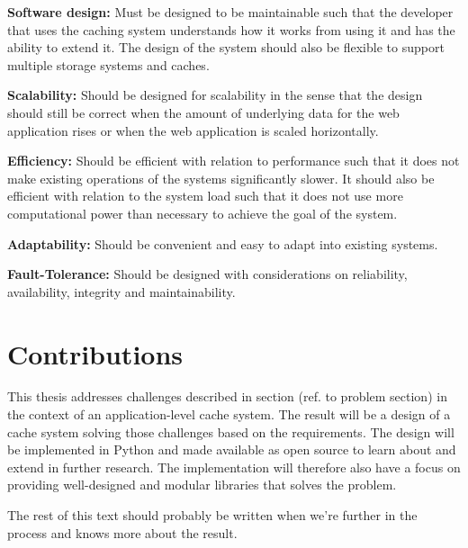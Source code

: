 \textbf{Software design:} Must be designed to be maintainable such that the developer that uses the caching system understands how it works from using it and has the ability to extend it. The design of the system should also be flexible to support multiple storage systems and caches.

\textbf{Scalability:} Should be designed for scalability in the sense that the design should still be correct when the amount of underlying data for the web application rises or when the web application is scaled horizontally.

\textbf{Efficiency:} Should be efficient with relation to performance such that it does not make existing operations of the systems significantly slower. It should also be efficient with relation to the system load such that it does not use more computational power than necessary to achieve the goal of the system.

\textbf{Adaptability:} Should be convenient and easy to adapt into existing systems.

\textbf{Fault-Tolerance:} Should be designed with considerations on reliability, availability, integrity and maintainability.

\section{Contributions}
This thesis addresses challenges described in section (ref. to problem section) in the context of an application-level cache system. The result will be a design of a cache system solving those challenges based on the requirements. The design will be implemented in Python and made available as open source to learn about and extend in further research. The implementation will therefore also have a focus on providing well-designed and modular libraries that solves the problem.

The rest of this text should probably be written when we’re further in the process and knows more about the result.
